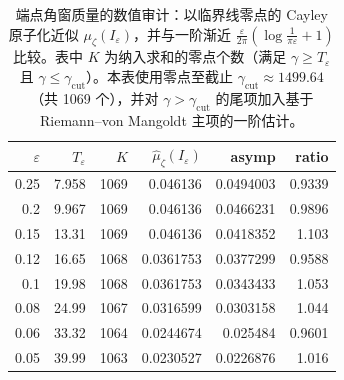 \begin{table}[H]
\centering
\small
\begin{tabular}{rrrrrr}
\toprule
$\varepsilon$ & $T_{\varepsilon}$ & $K$ & $\widehat\mu_{\zeta}(I_{\varepsilon})$ & asymp & ratio\\
\midrule
0.25 & 7.958 & 1069 & 0.046136 & 0.0494003 & 0.9339\\
0.2 & 9.967 & 1069 & 0.046136 & 0.0466231 & 0.9896\\
0.15 & 13.31 & 1069 & 0.046136 & 0.0418352 & 1.103\\
0.12 & 16.65 & 1068 & 0.0361753 & 0.0377299 & 0.9588\\
0.1 & 19.98 & 1068 & 0.0361753 & 0.0343433 & 1.053\\
0.08 & 24.99 & 1067 & 0.0316599 & 0.0303158 & 1.044\\
0.06 & 33.32 & 1064 & 0.0244674 & 0.025484 & 0.9601\\
0.05 & 39.99 & 1063 & 0.0230527 & 0.0226876 & 1.016\\
\bottomrule
\end{tabular}
\caption{端点角窗质量的数值审计：以临界线零点的 Cayley 原子化近似 $\mu_{\zeta}(I_{\varepsilon})$，并与一阶渐近 $\frac{\varepsilon}{2\pi}(\log\frac{1}{\pi\varepsilon}+1)$ 比较。表中 $K$ 为纳入求和的零点个数（满足 $\gamma\ge T_{\varepsilon}$ 且 $\gamma\le \gamma_{\mathrm{cut}}$）。本表使用零点至截止 $\gamma_{\mathrm{cut}}\approx 1499.64$（共 1069 个），并对 $\gamma>\gamma_{\mathrm{cut}}$ 的尾项加入基于 Riemann--von Mangoldt 主项的一阶估计。}
\label{tab:horizon-mu-endpoint-window-asymptotic}
\end{table}
